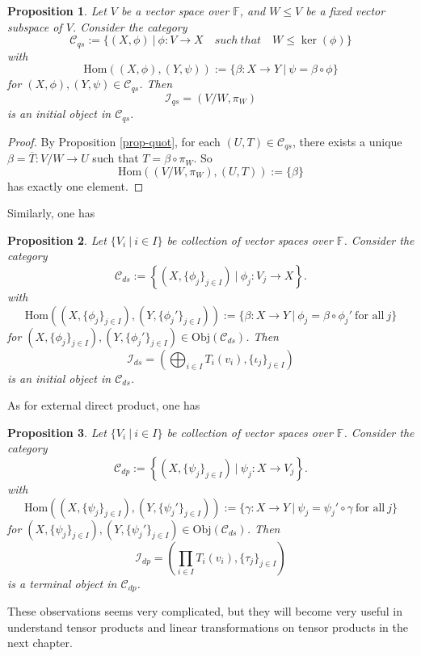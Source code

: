 \documentclass[11pt,openany]{book}
\theoremstyle{plain}
\newtheorem{proposition}[proposition]{Proposition}
\theoremstyle{definition}
\theoremstyle{remark}
\begin{document}
\begin{proposition}
    Let $V$ be a vector space over $\mathbb{F}$, and $W \leq V$ be a fixed vector subspace of $V$. Consider the category
    $$\mathcal{C}_{qs} := \{(X,\phi)\ |\ \phi:V \to X \quad such\ that\quad W \leq \ker(\phi)\}$$
    with 
    $$\mathrm{Hom}((X,\phi),(Y,\psi)) := \{\beta:X \to Y\ |\ \psi = \beta \circ \phi\}$$ 
    for $(X,\phi),(Y,\psi) \in \mathcal{C}_{qs}$. Then
    $$\mathcal{I}_{qs} = (V/W,\pi_W)$$
    is an initial object in $\mathcal{C}_{qs}$.
 \end{proposition}
\begin{proof}
    By Proposition \ref{prop-quot}, for each $(U,T) \in \mathcal{C}_{qs}$, there exists a unique $\beta = \overline{T}: V/W \to U$ such that $T = \beta \circ \pi_W$. So  
    $$\mathrm{Hom}((V/W,\pi_W),(U,T)) := \{\beta\}$$ 
    has exactly one element.
\end{proof}
Similarly, one has
\begin{proposition}
    Let $\{V_i\ |\ i \in I\}$ be collection of vector spaces over $\mathbb{F}$. Consider the category
    $$\mathcal{C}_{ds} := \left\{(X, \{\phi_j\}_{j \in I})\ |\ \phi_j : V_j \to X \right\}.$$
    with
$$\mathrm{Hom}((X,\{\phi_j\}_{j \in I}),(Y,\{\phi_j'\}_{j \in I})) := \{\beta:X \to Y\ |\ \phi_j = \beta \circ \phi_j'\ \text{for all}\ j\}$$ 
for $(X,\{\phi_j\}_{j \in I}), (Y,\{\phi_j'\}_{j \in I}) \in \mathrm{Obj}(\mathcal{C}_{ds})$. Then 
$$\mathcal{I}_{ds} = \left(\bigoplus_{i \in I} T_i(v_i), \{\iota_j\}_{j \in I}\right)$$ 
is an initial object in $\mathcal{C}_{ds}$.
\end{proposition}
As for external direct product, one has
\begin{proposition}
    Let $\{V_i\ |\ i \in I\}$ be collection of vector spaces over $\mathbb{F}$. Consider the category
    $$\mathcal{C}_{dp} := \left\{(X, \{\psi_j\}_{j \in I})\ |\ \psi_j : X \to V_j \right\}.$$
    with 
$$\mathrm{Hom}((X,\{\psi_j\}_{j \in I}),(Y,\{\psi_j'\}_{j \in I})) := \{\gamma:X \to Y\ |\ \psi_j = \psi_j' \circ \gamma\ \text{for all}\ j\}$$ 
 for $(X,\{\psi_j\}_{j \in I}), (Y,\{\psi_j'\}_{j \in I}) \in \mathrm{Obj}(\mathcal{C}_{ds})$. Then 
$$\mathcal{I}_{dp} = \left(\prod_{i \in I} T_i(v_i), \{\tau_j\}_{j \in I}\right)$$ 
is a terminal object in $\mathcal{C}_{dp}$.
\end{proposition}
These observations seems very complicated, but they will become very useful in understand tensor products and linear transformations on tensor products in the next chapter.
\end{document}
